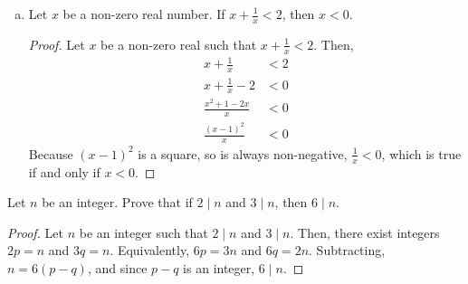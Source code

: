 \begin{enumerate}[(a)]
\begin{proof}
          Then, $x = \frac{p}{q}$ for integers $p$ and $q$.
          Also, $x+y = \frac{n}{m}$ for integers $n$ and $m$.
          Substituting, $\frac{p}{q} + y = \frac{n}{m}$.
          Rearranging,
          \begin{equation*}
            \frac{p}{q} + y = \frac{n}{m}        \iff
            p+yq            = \frac{qn}{m}       \iff
            y               = \frac{qn - mp}{qm}
          \end{equation*}
          but if $y$ equals the ratio of two integers ($qn-mp$ and $qm$), by definition, $y$ is rational.

          Therefore, by contradiction, the sum of a rational number and an irrational number is irrational.
        \end{proof}

  \item Let $x$ be a non-zero real number. If $x + \frac{1}{x} < 2$, then $x < 0$.
        \begin{proof}
          Let $x$ be a non-zero real such that $x + \frac{1}{x} < 2$. Then,
          \begin{align*}
            x + \frac{1}{x}        & < 2 \\
            x + \frac{1}{x} - 2    & < 0 \\
            \frac{x^2 + 1 - 2x}{x} & < 0 \\
            \frac{(x-1)^2}{x}      & < 0
          \end{align*}
          Because $(x-1)^2$ is a square, so is always non-negative, $\frac{1}{x} < 0$, which is true if and only if $x < 0$.
        \end{proof}
\end{enumerate}



\question Let $n$ be an integer.
Prove that if $2 \mid n$ and $3 \mid n$, then $6 \mid n$.
\begin{proof}
  Let $n$ be an integer such that $2 \mid n$ and $3 \mid n$.
  Then, there exist integers $2p = n$ and $3q = n$.
  Equivalently, $6p = 3n$ and $6q = 2n$.
  Subtracting, $n = 6(p-q)$, and since $p-q$ is an integer, $6 \mid n$.
\end{proof}

